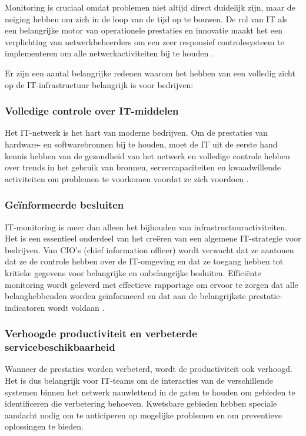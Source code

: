 Monitoring is cruciaal omdat problemen niet altijd direct duidelijk zijn, maar de neiging hebben om zich in de loop van de tijd op te bouwen. De rol van IT als een belangrijke motor van operationele prestaties en innovatie maakt het een verplichting van netwerkbeheerders om een ​​zeer responsief controlesysteem te implementeren om alle netwerkactiviteiten bij te houden \autocite{Matrix2016}.

Er zijn een aantal belangrijke redenen waarom het hebben van een volledig zicht op de IT-infrastructuur belangrijk is voor bedrijven: 

\subsubsection{Volledige controle over IT-middelen}

Het IT-netwerk is het hart van moderne bedrijven. Om de prestaties van hardware- en softwarebronnen bij te houden, moet de IT uit de eerste hand kennis hebben van de gezondheid van het netwerk en volledige controle hebben over trends in het gebruik van bronnen, servercapaciteiten en kwaadwillende activiteiten om problemen te voorkomen voordat ze zich voordoen \autocite{Matrix2016}.

\subsubsection{Geïnformeerde besluiten}

IT-monitoring is meer dan alleen het bijhouden van infrastructuuractiviteiten. Het is een essentieel onderdeel van het creëren van een algemene IT-strategie voor bedrijven. Van CIO's (chief information officer) wordt verwacht dat ze aantonen dat ze de controle hebben over de IT-omgeving en dat ze toegang hebben tot kritieke gegevens voor belangrijke en onbelangrijke besluiten. Efficiënte monitoring wordt geleverd met effectieve rapportage om ervoor te zorgen dat alle belanghebbenden worden geïnformeerd en dat aan de belangrijkste prestatie-indicatoren wordt voldaan \autocite{Matrix2016}.

\subsubsection{Verhoogde productiviteit en verbeterde servicebeschikbaarheid}

Wanneer de prestaties worden verbeterd, wordt de productiviteit ook verhoogd. Het is dus belangrijk voor IT-teams om de interacties van de verschillende systemen binnen het netwerk nauwlettend in de gaten te houden om gebieden te identificeren die verbetering behoeven. Kwetsbare gebieden hebben speciale aandacht nodig om te anticiperen op mogelijke problemen en om preventieve oplossingen te bieden.


